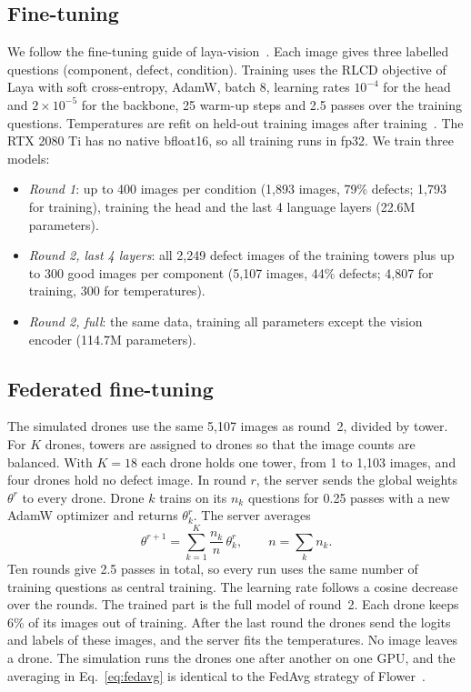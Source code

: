 \documentclass[preprint,12pt]{elsarticle}
\begin{document}
\subsection{Fine-tuning}

We follow the fine-tuning guide of laya-vision~\cite{layavision}. Each image gives three labelled questions (component, defect, condition). Training uses the RLCD objective of Laya with soft cross-entropy, AdamW, batch 8, learning rates $10^{-4}$ for the head and $2\times10^{-5}$ for the backbone, 25 warm-up steps and 2.5 passes over the training questions. Temperatures are refit on held-out training images after training~\cite{guo2017}. The RTX 2080 Ti has no native bfloat16, so all training runs in fp32. We train three models:
\begin{itemize}
\item \emph{Round 1}: up to 400 images per condition (1,893 images, 79\% defects; 1,793 for training), training the head and the last 4 language layers (22.6M parameters).
\item \emph{Round 2, last 4 layers}: all 2,249 defect images of the training towers plus up to 300 good images per component (5,107 images, 44\% defects; 4,807 for training, 300 for temperatures).
\item \emph{Round 2, full}: the same data, training all parameters except the vision encoder (114.7M parameters).
\end{itemize}

\subsection{Federated fine-tuning}

The simulated drones use the same 5,107 images as round~2, divided by tower. For $K$ drones, towers are assigned to drones so that the image counts are balanced. With $K=18$ each drone holds one tower, from 1 to 1,103 images, and four drones hold no defect image. In round $r$, the server sends the global weights $\theta^{r}$ to every drone. Drone $k$ trains on its $n_k$ questions for 0.25 passes with a new AdamW optimizer and returns $\theta_k^{r}$. The server averages
\begin{equation}\label{eq:fedavg}
\theta^{r+1} = \sum_{k=1}^{K} \frac{n_k}{n}\,\theta_k^{r}, \qquad n = \sum_{k} n_k .
\end{equation}
Ten rounds give 2.5 passes in total, so every run uses the same number of training questions as central training. The learning rate follows a cosine decrease over the rounds. The trained part is the full model of round~2. Each drone keeps 6\% of its images out of training. After the last round the drones send the logits and labels of these images, and the server fits the temperatures. No image leaves a drone. The simulation runs the drones one after another on one GPU, and the averaging in Eq.~\eqref{eq:fedavg} is identical to the FedAvg strategy of Flower~\cite{flower}.
\end{document}

